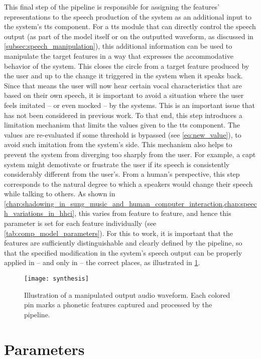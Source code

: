 This final step of the pipeline is responsible for assigning the features' representations to the speech production of the system as an additional input to the system's \ac{tts} component.
For a \ac{tts} module that can directly control the speech output (as part of the model itself or on the outputted waveform, as discussed in \cref{subsec:speech_manipulation}),
this additional information can be used to manipulate the target features in a way that expresses the accommodative behavior of the system.
This closes the circle from a target feature produced by the user and up to the change it triggered in the system when it speaks back.
Since that means the user will now hear certain vocal characteristics that are based on their own speech, it is important to avoid a situation where the user feels imitated -- or even mocked -- by the systems.
This is an important issue that has not been considered in previous work.
To that end, this step introduces a limitation mechanism that limits the values given to the \ac{tts} component.
The values are re-evaluated if some threshold is bypassed (see \cref{eq:new_value}), to avoid such imitation from the system's side.
This mechanism also helps to prevent the system from diverging too sharply from the user.
For example, a \ac{capt} system might demotivate or frustrate the user if its speech is consistently considerably different from the user's.
From a human's perspective, this step corresponds to the natural degree to which a speakers would change their speech while talking to others.
As shown in \cref{chap:shadowing_in_sung_music_and_human_computer_interaction,chap:speech_variations_in_hhci}, this varies from feature to feature, and hence this parameter is set for each feature individually (see \cref{tab:comp_model_parameters}).
For this to work, it is important that the features are sufficiently distinguishable and clearly defined by the pipeline, so that the specified modification in the system's speech output can be properly applied in -- and only in -- the correct places, as illustrated in \cref{fig:adapted_synthesis_output}.
%
\begin{figure}[t]
	\centering
	\texttt{[image: synthesis]}
	\caption[Manipulated features on a synthesized waveform (illustration)]
		{Illustration of a manipulated output audio waveform.
		Each colored pin marks a phonetic features captured and processed by the pipeline.}
	\label{fig:adapted_synthesis_output}
\end{figure}

\section{Parameters}
\label{sec:parameters}

